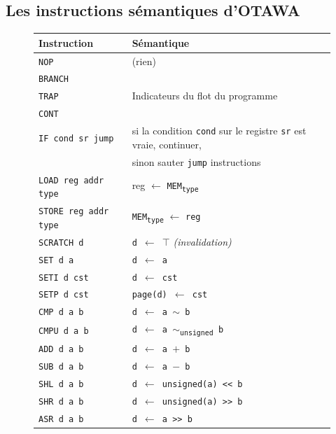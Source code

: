 \documentclass[french]{article}
\begin{document}
  \newpage{} %
  \subsection{Les instructions sémantiques d'OTAWA}

  \begin{figure}
    \begin{tabular}{|l|l|} \hline
      \textbf{Instruction} & \textbf{Sémantique}\\ \hline \hline
      \texttt{NOP} & (rien)\\ \hline
      \texttt{BRANCH} & \\
      \texttt{TRAP} & Indicateurs du flot du programme\\
      \texttt{CONT} & \\ \hline
      \texttt{IF cond sr jump} & si la condition \texttt{cond} sur le registre \texttt{sr} est vraie, continuer,\\
      & sinon sauter \texttt{jump} instructions\\ \hline
      \texttt{LOAD reg addr type} & reg $\leftarrow$ \texttt{MEM\textsubscript{type}} \\ \hline
      \texttt{STORE reg addr type} & \texttt{MEM\textsubscript{type}} $\leftarrow$ \texttt{reg}\\ \hline
      \texttt{SCRATCH d} & \texttt{d $\leftarrow$ $\top$} \textit{(invalidation)}\\ \hline
      \texttt{SET d a} & \texttt{d $\leftarrow$ a}\\ \hline
      \texttt{SETI d cst} & \texttt{d $\leftarrow$ cst}\\ \hline
      \rowcolor{Gray} \texttt{SETP d cst} & \texttt{page(d) $\leftarrow$ cst}\\ \hline
      \texttt{CMP d a b} & \texttt{d $\leftarrow$ a $\sim$ b}\\ \hline
      \rowcolor{Gray} \texttt{CMPU d a b} & \texttt{d $\leftarrow$ a $\sim$\textsubscript{unsigned} b}\\ \hline
      \texttt{ADD d a b} & \texttt{d $\leftarrow$ a $+$ b}\\ \hline
      \texttt{SUB d a b} & \texttt{d $\leftarrow$ a $-$ b}\\ \hline
      \rowcolor{Gray} \texttt{SHL d a b} & \texttt{d $\leftarrow$ unsigned(a) <{<} b}\\ \hline
      \rowcolor{Gray} \texttt{SHR d a b} & \texttt{d $\leftarrow$ unsigned(a) >{>} b}\\ \hline
      \texttt{ASR d a b} & \texttt{d $\leftarrow$ a >{>} b}\\ \hline

\end{tabular}
\end{figure}
\end{document}
